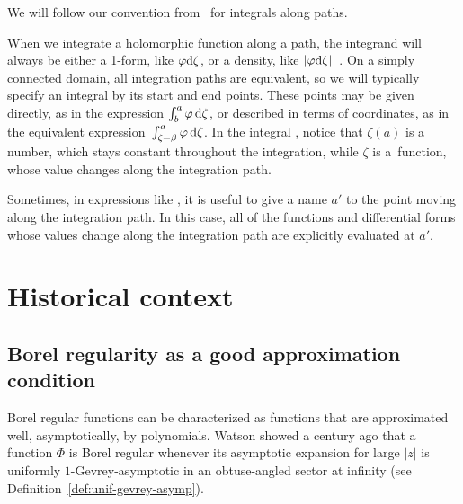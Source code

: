 \documentclass[10pt,a4paper]{amsart}
\numberwithin{equation}{section}
\begin{document}
We will follow our convention from~\cite{reg-sing-volterra} for integrals along paths.
\begin{notation*}
When we integrate a holomorphic function along a path, the integrand will always be either a 1-form, like $\varphi {\rm d}\zeta$, or a density, like $|\varphi {\rm d}\zeta|$~\cite[Section~1.8]{local-viewpoint}. On a simply connected domain, all integration paths are equivalent, so we will typically specify an integral by its start and end points. These points may be given directly, as in the expression $\int_b^a \varphi \,{\rm d}\zeta$, or described in terms of coordinates, as in the equivalent expression~${\int_{\zeta = \beta}^a \varphi\, {\rm d}\zeta}$. In the integral
,
notice that $\zeta(a)$ is a number, which stays constant throughout the integration, while $\zeta$ is a~function, whose value changes along the integration path.

Sometimes, in expressions like
,
it is useful to give a name $a'$ to the point moving along the integration path. In this case, all of the functions and differential forms whose values change along the integration path are explicitly evaluated at $a'$.
\end{notation*}
%
\section{Historical context}\label{sec:historical-context}
%
\subsection{Borel regularity as a good approximation condition}
Borel regular functions can be characterized as functions that are approximated well, asymptotically, by polynomials. Watson showed a century ago \cite[Part II, Section 9]{watson2} that a function $\Phi$ is Borel regular whenever its asymptotic expansion for large $|z|$ is uniformly $1$-Gevrey-asymptotic in an obtuse-angled sector at infinity (see Definition~\ref{def:unif-gevrey-asymp}).
\end{document}
